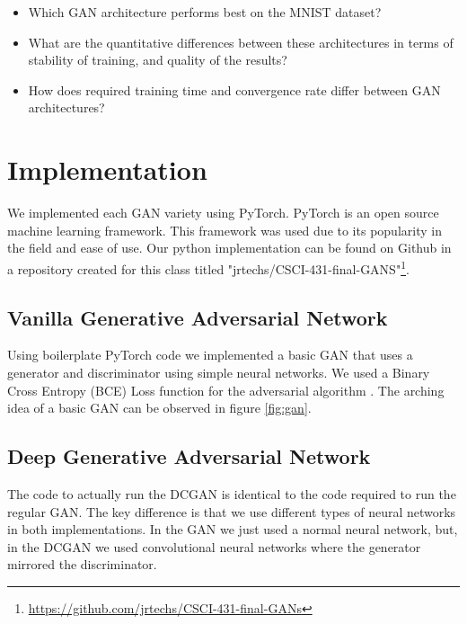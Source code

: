 \documentclass[12pt,
 reprint,
nofootinbib,
 amsmath,amssymb,
 aps,
floatfix,
]{revtex4-2}
\begin{document}
\begin{itemize}
    \item Which GAN architecture performs best on the MNIST dataset?
    \item What are the quantitative differences between these architectures in terms of stability of training, and quality of the results? 
    \item How does required training time and convergence rate differ between GAN architectures?
\end{itemize}


\section{\label{sec:implementation}Implementation}

We implemented each GAN variety using PyTorch. PyTorch is an open source machine learning framework. This framework was used due to its popularity in the field and ease of use\cite{pytorch}. Our python implementation can be found on Github in a repository created for this class titled "jrtechs/CSCI-431-final-GANS"\footnote{\url{https://github.com/jrtechs/CSCI-431-final-GANs}}.


\subsection{\label{sec:impVanilla}Vanilla Generative Adversarial Network}

Using boilerplate PyTorch code we implemented a basic GAN that uses a generator and discriminator using simple neural networks. We used a Binary Cross Entropy (BCE) Loss function for the adversarial algorithm \cite{generalDeepLearning}. 
The arching idea of a basic GAN can be observed in figure \ref{fig:gan}.


\subsection{\label{sec:impDCGAN}Deep Generative Adversarial Network}

The code to actually run the DCGAN is identical to the code required to run the regular GAN. The key difference is that we use different types of neural networks in both implementations. In the GAN we just used a normal neural network, but, in the DCGAN we used convolutional neural networks where the generator mirrored the discriminator.
\end{document}
